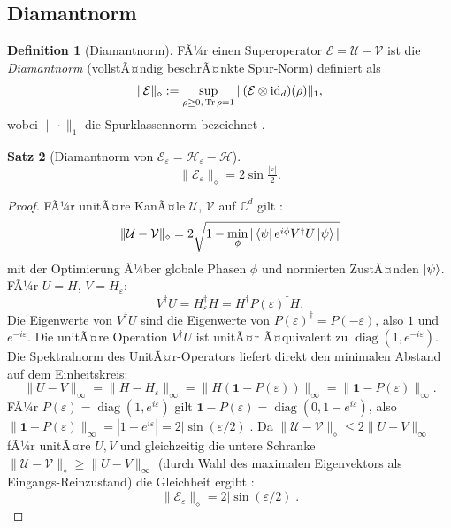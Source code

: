 ﻿\documentclass[11pt,a4paper]{article}
\theoremstyle{definition}
\newtheorem{theorem}{Satz}[section]
\newtheorem{definition}[theorem]{Definition}
\DeclareMathOperator{\diag}{diag}
\newcommand{\eps}{\varepsilon}
\newcommand{\Heps}{H_{\!\varepsilon}}
\newcommand{\C}{\mathbb{C}}
\begin{document}
\subsection{Diamantnorm}
\label{subsec:diamond}

\begin{definition}[Diamantnorm]
  FÃ¼r einen Superoperator $\mathcal{E} = \mathcal{U} - \mathcal{V}$ ist die
  \emph{Diamantnorm} (vollstÃ¤ndig beschrÃ¤nkte Spur-Norm) definiert als
  \begin{equation}
    \|\mathcal{E}\|_\diamond := \sup_{\rho \geq 0,\, \Tr\rho = 1}
    \|(\mathcal{E}\otimes\mathrm{id}_{d})(\rho)\|_1,
    \label{eq:diamond_def}
  \end{equation}
  wobei $\|\cdot\|_1$ die Spurklassennorm bezeichnet \cite{Kitaev2002}.
\end{definition}

\begin{theorem}[Diamantnorm von $\mathcal{E}_\eps = \mathcal{H}_\eps - \mathcal{H}$]
\label{thm:diamond}
  \begin{equation}
    \|\mathcal{E}_\eps\|_\diamond = 2\sin\!\tfrac{|\eps|}{2}.
    \label{eq:diamond_result}
  \end{equation}
\end{theorem}

\begin{proof}
  FÃ¼r unitÃ¤re KanÃ¤le $\mathcal{U}$, $\mathcal{V}$ auf $\C^d$ gilt
  \cite{Watrous2018}:
  \[
    \|\mathcal{U} - \mathcal{V}\|_\diamond = 2\sqrt{1 - \min_\phi |\bra{\psi}e^{i\phi}V^\dagger U\ket{\psi}|}
  \]
  mit der Optimierung Ã¼ber globale Phasen $\phi$ und normierten ZustÃ¤nden $\ket{\psi}$.
  FÃ¼r $U=H$, $V=\Heps$:
  \[
    V^\dagger U = \Heps^\dagger H = H^\dagger P(\eps)^\dagger H.
  \]
  Die Eigenwerte von $V^\dagger U$ sind die Eigenwerte von $P(\eps)^\dagger = P(-\eps)$,
  also $1$ und $e^{-i\eps}$.  Die unitÃ¤re Operation $V^\dagger U$ ist unitÃ¤r Ã¤quivalent
  zu $\diag(1, e^{-i\eps})$.  Die Spektralnorm des UnitÃ¤r-Operators liefert direkt
  den minimalen Abstand auf dem Einheitskreis:
  \[
    \|U - V\|_\infty = \|H - \Heps\|_\infty = \|H(\mathbf{1} - P(\eps))\|_\infty
    = \|\mathbf{1} - P(\eps)\|_\infty.
  \]
  FÃ¼r $P(\eps) = \diag(1, e^{i\eps})$ gilt
  $\mathbf{1} - P(\eps) = \diag(0, 1-e^{i\eps})$, also
  $\|\mathbf{1}-P(\eps)\|_\infty = |1-e^{i\eps}| = 2|\sin(\eps/2)|$.
  Da $\|\mathcal{U}-\mathcal{V}\|_\diamond \leq 2\|U-V\|_\infty$ fÃ¼r unitÃ¤re $U,V$
  und gleichzeitig die untere Schranke
  $\|\mathcal{U}-\mathcal{V}\|_\diamond \geq \|U-V\|_\infty$
  (durch Wahl des maximalen Eigenvektors als Eingangs-Reinzustand) die Gleichheit
  ergibt \cite{Kitaev2002,Watrous2018}:
  \[
    \|\mathcal{E}_\eps\|_\diamond = 2|\sin(\eps/2)|.
  \]
\end{proof}
\end{document}
